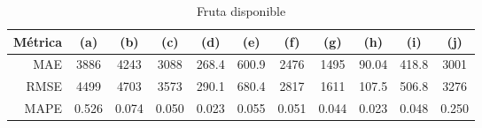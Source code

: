 \documentclass[a4paper,10pt]{article}
\begin{document}
\begin{table}[h!]
 \begin{center}
  \begin{tabular}{|r|c|c|c|c|c|c|c|c|c|c|}
    Métrica & (a) & (b) & (c) & (d) & (e) & (f) & (g) & (h) & (i) & (j) \\ \hline
    MAE & 3886 & 4243 & 3088 & 268.4 & 600.9 & 2476 & 1495 & 90.04 & 418.8 & 3001 \\
    RMSE & 4499 & 4703 & 3573 & 290.1 & 680.4 & 2817 & 1611 & 107.5 & 506.8 & 3276 \\
    MAPE & 0.526 & 0.074 & 0.050 & 0.023 & 0.055 & 0.051 & 0.044 & 0.023 & 0.048 & 0.250 \\ \hline
  \end{tabular}
  \caption{Fruta disponible}
  \label{tab:ada_prophet_wk}
 \end{center}
\end{table}
\end{document}
